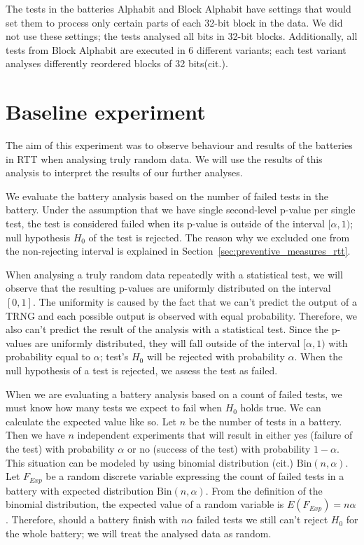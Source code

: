 \documentclass[
  digital,  	%
  color,		%
  oneside,   	%
  12pt,
  nocover,
  notable,
  nolof,
  nolot,
]{fithesis3}
\theoremstyle{definition}
\theoremstyle{remark}
\begin{document}
The tests in the batteries Alphabit and Block Alphabit have settings that would set them to process only certain parts of each 32-bit block in the data. We did not use these settings; the tests analysed all bits in 32-bit blocks. Additionally, all tests from Block Alphabit are executed in 6 different variants; each test variant analyses differently reordered blocks of 32 bits(cit.).

\section{Baseline experiment}
\label{sec:baseline_exp}
The aim of this experiment was to observe behaviour and results of the batteries in RTT when analysing truly random data.  We will use the results of this analysis to interpret the results of our further analyses.

We evaluate the battery analysis based on the number of failed tests in the battery. Under the assumption that we have single second-level p-value per single test, the test is considered failed when its p-value is outside of the interval $[\alpha, 1)$; null hypothesis $H_0$ of the test is rejected. The reason why we excluded one from the non-rejecting interval is explained in Section~\ref{sec:preventive_measures_rtt}.

When analysing a truly random data repeatedly with a statistical test, we will observe that the resulting p-values are uniformly distributed on the interval $[0,1]$. The uniformity is caused by the fact that we can't predict the output of a TRNG and each possible output is observed with equal probability. Therefore, we also can't predict the result of the analysis with a statistical test. Since the p-values are uniformly distributed, they will fall outside of the interval $[\alpha, 1)$ with probability equal to $\alpha$; test's $H_0$ will be rejected with probability $\alpha$. When the null hypothesis of a test is rejected, we assess the test as failed.

When we are evaluating a battery analysis based on a count of failed tests, we must know how many tests we expect to fail when $H_0$ holds true. We can calculate the expected value like so. Let $n$ be the number of tests in a battery. Then we have $n$ independent experiments that will result in either yes (failure of the test) with probability $\alpha$ or no (success of the test) with probability $1-\alpha$. This situation can be modeled by using binomial distribution (cit.) $\text{Bin}(n, \alpha)$. Let $F_{Exp}$ be a random discrete variable expressing the count of failed tests in a battery with expected distribution $\text{Bin}(n, \alpha)$. From the definition of the binomial distribution, the expected value of a random variable is $E(F_{Exp}) = n\alpha$. Therefore, should a battery finish with $n\alpha$ failed tests we still can't reject $H_0$ for the whole battery; we will treat the analysed data as random.
\end{document}
